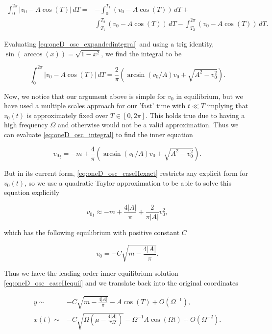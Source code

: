 \begin{equation}\label{eq:oneD_osc_expandedintegral}
\begin{aligned}
\int_0^{2\pi}|v_0-A\cos(T)|\,dT=&-\int_0^{T_1}(v_0-A\cos(T))\,dT+\\
&\int_{T_1}^{T_2}(v_0-A\cos(T))\,dT-\int_{T_2}^{2\pi}(v_0-A\cos(T))\,dT.
\end{aligned}
\end{equation}

Evaluating \eqref{eq:oneD_osc_expandedintegral} and using a trig identity, $\sin(\arccos(x))=\sqrt{1-x^2}$, we find the integral to be

\begin{equation*}
\int_0^{2\pi}|v_0-A\cos(T)|\,dT=\frac{2}{\pi}\left(\arcsin(v_0/A)v_0+\sqrt{A^2-v_0^2}\right).
\end{equation*}

Now, we notice that our argument above is simple for $v_0$ in equilibrium, but we have used a multiple scales approach for our 'fast' time with $t\ll T$ implying that $v_0(t)$ is approximately fixed over $T\in [0,2\pi]$. This holds true due to having a high frequency $\Omega$ and otherwise would not be a valid approximation. Thus we can evaluate \eqref{eq:oneD_osc_integral} to find the inner equation 

\begin{equation}\label{eq:oneD_osc_caseIIexact}
{v_0}_t=-m+\frac{4}{\pi}\left(\arcsin(v_0/A)v_0+\sqrt{A^2-v_0^2}\right).
\end{equation}

But in its current form, \eqref{eq:oneD_osc_caseIIexact} restricts any explicit form for $v_0(t)$, so we use a quadratic Taylor approximation to be able to solve this equation explicitly

\begin{equation}\label{eq:oneD_osc_caseIItaylor}
{v_0}_t \approx -m + \frac{4|A|}{\pi} + \frac{2}{\pi |A|}v_0^2,
\end{equation}

which has the following equilibrium with positive constant $C$

\begin{equation}\label{eq:oneD_osc_caseIIequil}
v_0=-C\sqrt{m-\frac{4|A|}{\pi}}.
\end{equation}

Thus we have the leading order inner equilibrium solution \eqref{eq:oneD_osc_caseIIequil} and we translate back into the original coordinates

\begin{equation}\label{eq:oneD_osc_innersoln}
\begin{aligned}
y\sim& -C\sqrt{m-\frac{4|A|}{\pi}}-A\cos(T)+O(\Omega^{-1}),\\ 
x(t)\sim& -C\sqrt{\Omega \left(\mu-\frac{4|A|}{\pi \Omega}\right)}-\Omega^{-1} A\cos(\Omega t)+O(\Omega^{-2}).
\end{aligned}
\end{equation}


